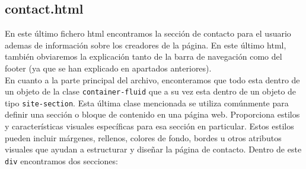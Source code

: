 \documentclass{article}
\begin{document}
\subsection{contact.html}
En este último fichero html encontramos la sección de contacto para el usuario ademas de información sobre los creadores de la página. En este último html, también obviaremos la explicación tanto de la barra de navegación como del footer (ya que se han explicado en apartados anteriores).\\

\noindent En cuanto a la parte principal del archivo, enconteramos que todo esta dentro de un objeto de la clase \texttt{container-fluid} que a su vez esta dentro de un objeto de tipo \texttt{site-section}. Esta última clase mencionada se utiliza comúnmente para definir una sección o bloque de contenido en una página web. Proporciona estilos y características visuales específicas para esa sección en particular. Estos estilos pueden incluir márgenes, rellenos, colores de fondo, bordes u otros atributos visuales que ayudan a estructurar y diseñar la página de contacto. Dentro de este \texttt{div} encontramos dos secciones:
\end{document}
